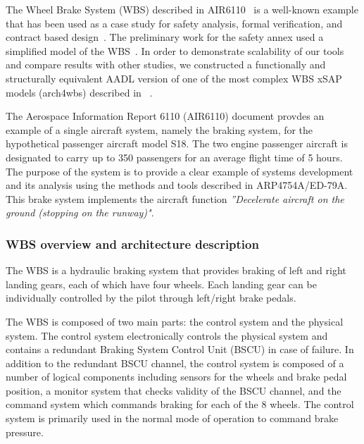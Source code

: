 The Wheel Brake System (WBS) described in AIR6110~\cite{AIR6110} is a well-known example that has been used as a case study for safety analysis, formal verification, and contract based design~\cite{DBLP:conf/cav/BozzanoCPJKPRT15, 10.1007/978-3-319-11936-6-7, CAV2015:BoCiGrMa, Joshi05:SafeComp}. The preliminary work for the safety annex used a simplified model of the WBS~\cite{Stewart17:IMBSA}. In order to demonstrate scalability of our tools and compare results with other studies, we constructed a functionally and structurally equivalent AADL version of %
one of the most complex WBS xSAP models (arch4wbs) described in 
~\cite{DBLP:conf/cav/BozzanoCPJKPRT15}.  %

The Aerospace Information Report 6110 (AIR6110) document provdes an example of a single aircraft system, namely the braking system, for the hypothetical passenger aircraft model S18. The two engine passenger aircraft is designated to carry up to 350 passengers for an average flight time of 5 hours. The purpose of the system is to provide a clear example of systems development and its analysis using the methods and tools described in ARP4754A/ED-79A. This brake system implements the aircraft function \textit{''Decelerate aircraft on the ground (stopping on the runway)"}.  

\subsubsection{WBS overview and architecture description}
The WBS is a hydraulic braking system that provides braking of left and right landing gears, each of which have four wheels. Each landing gear can be individually controlled by the pilot through left/right brake pedals. 

The WBS is composed of two main parts: the control system and the physical system. The control system electronically controls the physical system and contains a redundant Braking System Control Unit (BSCU) in case of failure. In addition to the redundant BSCU channel, the control system is composed of a number of logical components including sensors for the wheels and brake pedal position, a monitor system that checks validity of the BSCU channel, and the command system which commands braking for each of the 8 wheels. The control system is primarily used in the normal mode of operation to command brake pressure.  

